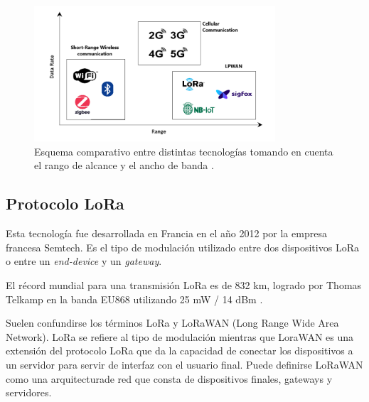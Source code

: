 \begin{figure}[H]
    \centering
    \includegraphics[width = 0.8\textwidth]{imagenes/cap1_marcoteo/CommPrtocolsComparison.png}
    \caption{Esquema comparativo entre distintas tecnologías tomando en cuenta el rango de alcance y el ancho de banda \citep{khorsandi2023performance}.}
    \label{fig:commcomparison}
\end{figure}

\subsection{Protocolo LoRa}

Esta tecnología fue desarrollada en Francia en el año 2012 por la empresa francesa Semtech. Es el tipo de modulación utilizado entre dos dispositivos LoRa o entre un \textit{end-device} y un \textit{gateway}. 

El récord mundial para una transmisión LoRa es de 832 km, logrado por Thomas Telkamp en la banda EU868 utilizando 25 mW / 14 dBm \citep{montagny2021lora}.

Suelen confundirse los términos LoRa y LoRaWAN (Long Range Wide Area Network). LoRa se refiere al tipo de modulación mientras que LoraWAN es una extensión del protocolo LoRa que da la capacidad de conectar los dispositivos a un servidor para servir de interfaz con el usuario final. Puede definirse LoRaWAN como una arquitecturade red que consta de dispositivos finales, gateways y servidores.

